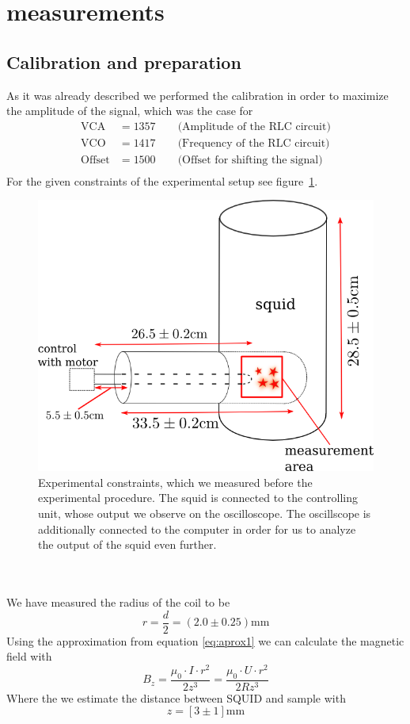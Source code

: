 \section{measurements}
\subsection{Calibration and preparation}
As it was already described we performed the calibration in order to maximize the amplitude of the
signal, which was the case for \\
\begin{align*}
     \mathrm{VCA} &= 1357 \qquad \text{(Amplitude of the RLC circuit)}\\
     \mathrm{VCO} &= 1417 \qquad\text{(Frequency of the RLC circuit)}\\ 
     \mathrm{Offset} &= 1500 \qquad\text{(Offset for shifting the signal)}\\
\end{align*}
For the given constraints of the experimental setup see figure~\ref{fig:setup1}.
\begin{figure}[htpb]
    \centering
    \includegraphics[width=0.8\linewidth]{figures/setup1}
    \caption{Experimental constraints, which we measured before the experimental procedure. The squid
    is connected to the controlling unit, whose output we observe on the oscilloscope. The oscillscope
    is additionally connected to the computer in order for us to analyze the output of the squid even further.}
    \label{fig:setup1}
\end{figure}
\\\\
We have measured the radius of the coil to be 
\begin{equation}
r = \frac{d}{2} = (2.0 \pm 0.25) \mathrm{mm}
\end{equation}
Using the approximation from equation \eqref{eq:aprox1} we can calculate the
magnetic field with 
\begin{equation}
B_z = \frac{\mu_0\cdot I \cdot r^2}{2z^3} = \frac{\mu_0\cdot U \cdot r^2}{2Rz^3} 
\end{equation}
Where the we estimate the distance between SQUID and sample with
\begin{equation}
z = \left[ 3 \pm 1 \right]\mathrm{mm}
\end{equation}



